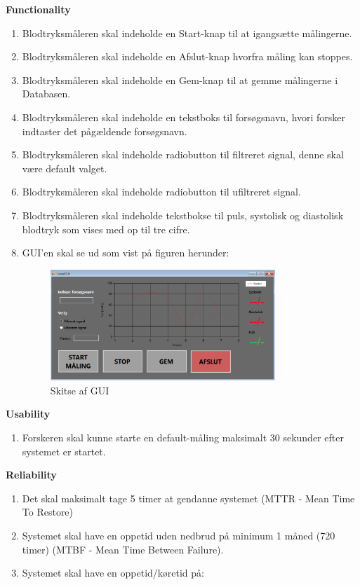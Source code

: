 \textbf{Functionality}
\begin{enumerate}
\item Blodtryksmåleren skal indeholde en Start-knap til at igangsætte målingerne. 
\item Blodtryksmåleren skal indeholde en Afslut-knap hvorfra måling kan stoppes.
\item Blodtryksmåleren skal indeholde en Gem-knap til at gemme målingerne i Databasen.
\item Blodtryksmåleren skal indeholde en tekstboks til forsøgsnavn, hvori forsker indtaster det pågældende forsøgsnavn.
\item Blodtryksmåleren skal indeholde radiobutton til filtreret signal, denne skal være default valget.
\item Blodtryksmåleren skal indeholde radiobutton til ufiltreret signal.
\item Blodtryksmåleren skal indeholde tekstbokse til puls, systolisk og diastolisk blodtryk som vises med op til tre cifre.
\item GUI’en skal se ud som vist på figuren herunder:
\begin{figure}[H]
	\centering
	\includegraphics[width=0.8\textwidth]{Figurer/GUI}
	\caption{Skitse af GUI}
	\label{fig:Skitse af GUI}
\end{figure}

\end{enumerate}

\textbf{Usability}
\begin{enumerate}
\item Forskeren skal kunne starte en default-måling maksimalt 30 sekunder efter systemet er startet.
\end{enumerate}

\textbf{Reliability}
\begin{enumerate}
\item Det skal maksimalt tage 5 timer at gendanne systemet (MTTR - Mean Time To Restore)
\item Systemet skal have en oppetid uden nedbrud på minimum 1 måned (720 timer) (MTBF - Mean Time Between Failure).   
\item Systemet skal have en oppetid/køretid på: 
\end{enumerate}

